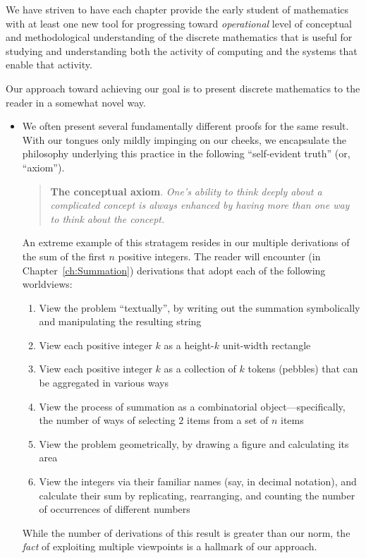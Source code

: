 We have striven to have each chapter provide the early student of
mathematics with at least one new tool for progressing toward {\em
  operational} level of conceptual and methodological understanding of
the discrete mathematics that is useful for studying and understanding
both the activity of computing and the systems that enable that
activity.

Our approach toward achieving our goal is to present discrete
mathematics to the reader in a somewhat novel way.
\begin{itemize}
\item
We often present several fundamentally different proofs for the same
result.  With our tongues only mildly impinging on our cheeks, we
encapsulate the philosophy underlying this practice in the following
``self-evident truth'' (or, ``axiom'').  
\begin{quote}
{\bf The conceptual axiom}.
{\em
One's ability to think deeply about a complicated concept is always
enhanced by having more than one way to think about the concept.}
\end{quote}

An extreme example of this stratagem resides in our multiple
derivations of the sum of the first $n$ positive integers.  The reader
will encounter (in Chapter~\ref{ch:Summation}) derivations that adopt
each of the following worldviews:
  \begin{enumerate}
    \item
View the problem ``textually'', by writing out the summation
symbolically and manipulating the resulting string
  \item
View each positive integer $k$ as a height-$k$ unit-width rectangle
  \item
View each positive integer $k$ as a collection of $k$ tokens (pebbles)
that can be aggregated in various ways
  \item
View the process of summation as a combinatorial
object---specifically, the number of ways of selecting $2$ items from
a set of $n$ items
  \item
View the problem geometrically, by drawing a figure and calculating
its area
  \item
View the integers via their familiar names (say, in decimal notation),
and calculate their sum by replicating, rearranging, and counting the
number of occurrences of different numbers
  \end{enumerate}
While the number of derivations of this result is greater than our
norm, the {\em fact} of exploiting multiple viewpoints is a hallmark
of our approach.


\end{itemize}

